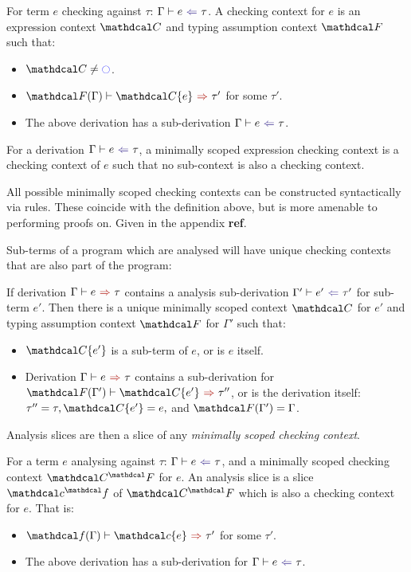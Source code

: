 \begin{definition}
\label{def:CheckingContext}
For term $e$ checking against $\tau$: $\analysis[\Gamma]{e}{\tau}$. A checking context for $e$ is an expression context $\C$ and typing assumption context $\F$ such that: 
\begin{itemize}
\item $\C \neq \cmark$.
\item $\synthesis[\F(\Gamma)]{\C\{e\}}{\tau'}$ for some $\tau'$.
\item The above derivation has a sub-derivation $\analysis[\Gamma]{e}{\tau}$.
\end{itemize}
\end{definition}
\begin{definition}
For a derivation $\analysis[\Gamma]{e}{\tau}$, a minimally scoped expression checking context is a checking context of $e$ such that no sub-context is also a checking context.
\end{definition}

All possible minimally scoped checking contexts can be constructed syntactically via rules. These coincide with the definition above, but is more amenable to performing proofs on. Given in the appendix \textbf{ref}.

Sub-terms of a program which are analysed will have unique checking contexts that are also part of the program:
\begin{proposition}
If derivation $\synthesis{e}{\tau}$ contains a analysis sub-derivation $\analysis[\Gamma']{e'}{\tau'}$ for sub-term $e'$. Then there is a unique minimally scoped context $\C$ for $e'$ and typing assumption context $\F$ for $\Gamma'$ such that:
\begin{itemize}
\item $\C\{e'\}$ is a sub-term of $e$, or is $e$ itself.
\item Derivation $\synthesis{e}{\tau}$ contains a sub-derivation for $\synthesis[\F(\Gamma')]{\C\{e'\}}{\tau''}$, or is the derivation itself: $\tau'' = \tau, \C\{e'\} = e,$ and $\F(\Gamma') = \Gamma$.
\end{itemize}
\end{proposition}

Analysis slices are then a slice of any \textit{minimally scoped checking context}.
\begin{definition}\label{def:analysisslice}
For a term $e$ analysing against $\tau$: $\analysis{e}{\tau}$, and a minimally scoped checking context $\C^\F$ for $e$. An analysis slice is a slice $\Cs^\f$ of $\C^\F$ which is also a checking context for $e$. That is:
\begin{itemize}
\item $\synthesis[\f(\Gamma)]{\Cs\{e\}}{\tau'}$ for some $\tau'$.
\item The above derivation has a sub-derivation for $\analysis{e}{\tau}$. 
\end{itemize}
\end{definition}

